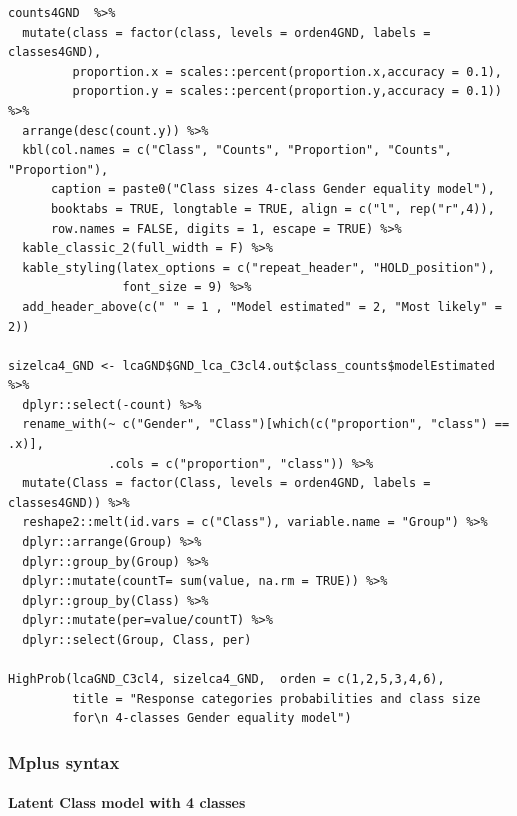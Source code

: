 \documentclass[12pt,a4paper,oneside]{reedthesis}
\begin{document}
\begin{verbatim}
counts4GND  %>% 
  mutate(class = factor(class, levels = orden4GND, labels = classes4GND),
         proportion.x = scales::percent(proportion.x,accuracy = 0.1),
         proportion.y = scales::percent(proportion.y,accuracy = 0.1)) %>% 
  arrange(desc(count.y)) %>% 
  kbl(col.names = c("Class", "Counts", "Proportion", "Counts", "Proportion"),
      caption = paste0("Class sizes 4-class Gender equality model"),
      booktabs = TRUE, longtable = TRUE, align = c("l", rep("r",4)), 
      row.names = FALSE, digits = 1, escape = TRUE) %>%
  kable_classic_2(full_width = F) %>% 
  kable_styling(latex_options = c("repeat_header", "HOLD_position"), 
                font_size = 9) %>% 
  add_header_above(c(" " = 1 , "Model estimated" = 2, "Most likely" = 2))

sizelca4_GND <- lcaGND$GND_lca_C3cl4.out$class_counts$modelEstimated %>% 
  dplyr::select(-count) %>% 
  rename_with(~ c("Gender", "Class")[which(c("proportion", "class") == .x)], 
              .cols = c("proportion", "class")) %>% 
  mutate(Class = factor(Class, levels = orden4GND, labels = classes4GND)) %>% 
  reshape2::melt(id.vars = c("Class"), variable.name = "Group") %>% 
  dplyr::arrange(Group) %>% 
  dplyr::group_by(Group) %>%
  dplyr::mutate(countT= sum(value, na.rm = TRUE)) %>%
  dplyr::group_by(Class) %>%
  dplyr::mutate(per=value/countT) %>% 
  dplyr::select(Group, Class, per) 

HighProb(lcaGND_C3cl4, sizelca4_GND,  orden = c(1,2,5,3,4,6), 
         title = "Response categories probabilities and class size 
         for\n 4-classes Gender equality model")  
\end{verbatim}
\hypertarget{mplus-syntax}{%
\subsubsection{Mplus syntax}\label{mplus-syntax}}

\hypertarget{latent-class-model-with-4-classes}{%
\paragraph{Latent Class model with 4 classes}\label{latent-class-model-with-4-classes}}
\end{document}
